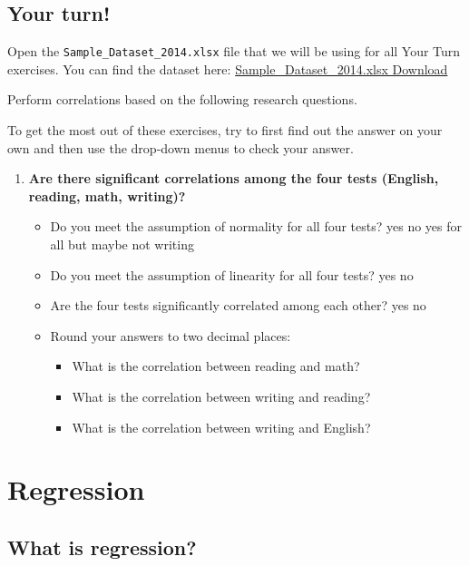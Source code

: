 \documentclass[
]{book}
\begin{document}
\hypertarget{your-turn-6}{%
\section{Your turn!}\label{your-turn-6}}

Open the \texttt{Sample\_Dataset\_2014.xlsx} file that we will be using for all Your Turn exercises. You can find the dataset here: \href{https://github.com/danawanzer/stats-with-jamovi/blob/master/data/Sample_Dataset_2014.xlsx}{Sample\_Dataset\_2014.xlsx Download}

Perform correlations based on the following research questions.

To get the most out of these exercises, try to first find out the answer on your own and then use the drop-down menus to check your answer.

\begin{enumerate}
\def\labelenumi{\arabic{enumi}.}
\item
  \textbf{Are there significant correlations among the four tests (English, reading, math, writing)?}

  \begin{itemize}
  \item
    Do you meet the assumption of normality for all four tests? yes no yes for all but maybe not writing
  \item
    Do you meet the assumption of linearity for all four tests? yes no
  \item
    Are the four tests significantly correlated among each other? yes no
  \item
    Round your answers to two decimal places:

    \begin{itemize}
    \item
      What is the correlation between reading and math?
    \item
      What is the correlation between writing and reading?
    \item
      What is the correlation between writing and English?
    \end{itemize}
  \end{itemize}
\end{enumerate}

\hypertarget{regression}{%
\chapter{Regression}\label{regression}}

\hypertarget{what-is-regression}{%
\section{What is regression?}\label{what-is-regression}}
\end{document}
